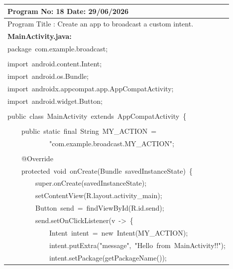 \documentclass[a4paper,12pt]{article}
\begin{document}
\noindent\begingroup
\renewcommand{\arraystretch}{1.1}
\begin{longtable}{|p{}|}
\hline\endfirsthead\hline\endhead\hline\endfoot\hline\endlastfoot
\rule{0pt}{13pt}Program No: 18 \hfill Date: 29/06/2026 \\
\hline
\rule{0pt}{13pt}Program Title : Create an app to broadcast a custom intent. \\
\hline
\rule{0pt}{13pt}\textbf{MainActivity.java:} \\
\hline
{\ttfamily\small package\ com.example.broadcast;} \\
\strut \\
{\ttfamily\small import\ android.content.Intent;} \\
{\ttfamily\small import\ android.os.Bundle;} \\
{\ttfamily\small import\ androidx.appcompat.app.AppCompatActivity;} \\
{\ttfamily\small import\ android.widget.Button;} \\
\strut \\
{\ttfamily\small public\ class\ MainActivity\ extends\ AppCompatActivity\ \{} \\
\strut \\
{\ttfamily\small \ \ \ \ public\ static\ final\ String\ MY\_ACTION\ =\ } \\
{\ttfamily\small \ \ \ \ \ \ \ \ \ \ \ \ "com.example.broadcast.MY\_ACTION";} \\
\strut \\
{\ttfamily\small \ \ \ \ @Override} \\
{\ttfamily\small \ \ \ \ protected\ void\ onCreate(Bundle\ savedInstanceState)\ \{} \\
{\ttfamily\small \ \ \ \ \ \ \ \ super.onCreate(savedInstanceState);} \\
{\ttfamily\small \ \ \ \ \ \ \ \ setContentView(R.layout.activity\_main);} \\
{\ttfamily\small \ \ \ \ \ \ \ \ Button\ send\ =\ findViewById(R.id.send);} \\
{\ttfamily\small \ \ \ \ \ \ \ \ send.setOnClickListener(v\ -\textgreater{}\ \{} \\
{\ttfamily\small \ \ \ \ \ \ \ \ \ \ \ \ Intent\ intent\ =\ new\ Intent(MY\_ACTION);} \\
{\ttfamily\small \ \ \ \ \ \ \ \ \ \ \ \ intent.putExtra("message",\ "Hello\ from\ MainActivity!!");} \\
{\ttfamily\small \ \ \ \ \ \ \ \ \ \ \ \ intent.setPackage(getPackageName());} \\

\end{longtable}
\end{document}
